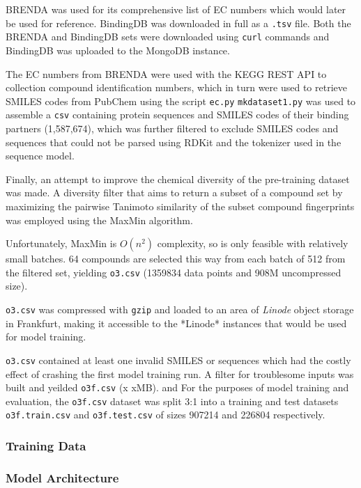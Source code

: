 \documentclass[16pt]{book}
\begin{document}
BRENDA was used for its comprehensive list of EC numbers which would later be used for reference.
BindingDB was downloaded in full as a \texttt{.tsv} file.
Both the BRENDA and BindingDB sets were downloaded using \texttt{curl} commands and BindingDB was uploaded to the MongoDB instance.

The EC numbers from BRENDA were used with the KEGG REST API to collection compound identification numbers, which in turn were used to retrieve SMILES codes from PubChem using the script \texttt{ec.py}
\texttt{mkdataset1.py} was used to assemble a \texttt{csv} containing protein sequences and SMILES codes of their binding partners (1,587,674), which was further filtered to exclude SMILES codes and sequences that could not be parsed using RDKit and the tokenizer used in the sequence model.

Finally, an attempt to improve the chemical diversity of the pre-training dataset was made.
A diversity filter that aims to return a subset of a compound set by maximizing the pairwise Tanimoto similarity of the subset compound fingerprints was employed using the MaxMin algorithm.


Unfortunately, MaxMin is $O(n^2)$ complexity, so is only feasible with relatively small batches.
64 compounds are selected this way from each batch of 512 from the filtered set, yielding \texttt{o3.csv} (1359834 data points and 908M uncompressed size).

\texttt{o3.csv} was compressed with \texttt{gzip} and loaded to an area of \textit{Linode} object storage in Frankfurt, making it accessible to the *Linode* instances that would be used for model training.

\texttt{o3.csv} contained at least one invalid SMILES or sequences which had the costly effect of crashing the first model training run.
A filter for troublesome inputs was built and yeilded \texttt{o3f.csv} (x xMB).
and
For the purposes of model training and evaluation, the \texttt{o3f.csv} dataset was split 3:1 into a training and test datasets  \texttt{o3f.train.csv} and \texttt{o3f.test.csv} of sizes 907214 and 226804 respectively.


\subsubsection{Training Data}

\subsubsection{Model Architecture}
\end{document}
